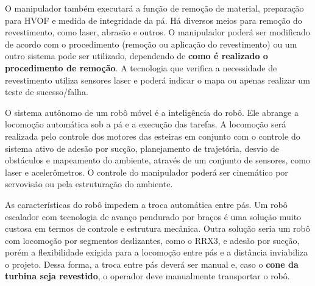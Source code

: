 O manipulador também executará a função de remoção de material, preparação para
HVOF e medida de integridade da pá. Há diversos meios para remoção do
revestimento, como laser, abrasão e outros. O manipulador poderá ser modificado
de acordo com o procedimento (remoção ou aplicação do revestimento) ou um outro
sistema pode ser utilizado, dependendo de \textbf{como é realizado o procedimento de remoção}. A tecnologia que
verifica a necessidade de revestimento utiliza sensores laser e poderá indicar o
mapa ou apenas realizar um teste de sucesso/falha.

O sistema autônomo de um robô móvel é a inteligência do robô. Ele abrange a
locomoção automática sob a pá e a execução das tarefas. A locomoção será
realizada pelo controle dos motores das esteiras em conjunto com o controle do
sistema ativo de adesão por sucção, planejamento de trajetória, desvio de
obstáculos e mapeamento do ambiente, através de um conjunto de sensores, como
laser e acelerômetros. O controle do manipulador poderá ser cinemático por
servovisão ou pela estruturação do ambiente.

As características do robô impedem a troca automática entre pás. Um robô
escalador com tecnologia de avanço pendurado por braços é uma solução muito
custosa em termos de controle e estrutura mecânica. Outra solução seria um robô
com locomoção por segmentos deslizantes, como o RRX3, e adesão por sucção, porém
a flexibilidade exigida para a locomoção entre pás e a distância inviabiliza o
projeto. Dessa forma, a troca entre pás deverá ser manual e, caso o \textbf{cone
da turbina seja revestido}, o operador deve manualmente transportar o robô.

